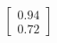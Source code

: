 \documentclass[preview]{standalone}
\begin{document}
\begin{align*}
\begin{bmatrix} 0.94 \\ 0.72 \end{bmatrix}
\end{align*}
\end{document}
